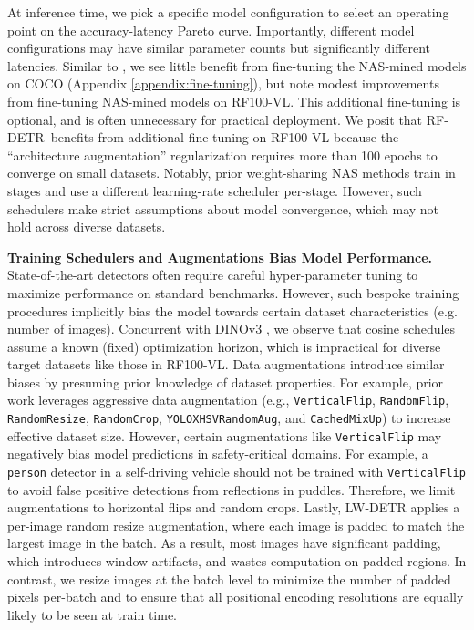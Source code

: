 \documentclass{article} %
\newcommand\isaac[1]{\textcolor{purered}{[Isaac: #1]}}
\newcommand\peter[1]{\textcolor{blue}{[Peter: #1]}}
\newcommand{\method}{RF-DETR}
\begin{document}
At inference time, we pick a specific model configuration to select an operating point on the accuracy-latency Pareto curve. Importantly, different model configurations may have similar parameter counts but significantly different latencies. Similar to \cite{cai2019ofa}, we see little benefit from fine-tuning the NAS-mined models on COCO (Appendix \ref{appendix:fine-tuning}), but note modest improvements from fine-tuning NAS-mined models on RF100-VL. This additional fine-tuning is optional, and is often unnecessary for practical deployment. We posit that \method \  benefits from additional fine-tuning on RF100-VL because the ``architecture augmentation'' regularization requires more than 100 epochs to converge on small datasets. Notably, prior weight-sharing NAS methods \citep{cai2019ofa} train in stages and use a different learning-rate scheduler per-stage. However, such schedulers make strict assumptions about model convergence, which may not hold across diverse datasets. %

\textbf{Training Schedulers and Augmentations Bias Model Performance.}
State-of-the-art detectors often require careful hyper-parameter tuning to maximize performance on standard benchmarks. However, such bespoke training procedures implicitly bias the model towards certain dataset characteristics (e.g. number of images). Concurrent with DINOv3 \citep{simeoni2025dinov3}, we observe that cosine schedules assume a known (fixed) optimization horizon, which is impractical for diverse target datasets like those in RF100-VL. %
Data augmentations introduce similar biases by presuming prior knowledge of dataset properties. For example, prior work leverages aggressive data augmentation (e.g., {\tt VerticalFlip}, {\tt RandomFlip}, {\tt RandomResize}, {\tt RandomCrop}, {\tt YOLOXHSVRandomAug}, and {\tt CachedMixUp}) to increase effective dataset size. However, certain augmentations like {\tt VerticalFlip} may negatively bias model predictions in safety-critical domains. For example, a {\tt person} detector in a self-driving vehicle should not be trained with {\tt VerticalFlip} to avoid false positive detections from reflections in puddles. Therefore, we limit augmentations to horizontal flips and random crops. %
Lastly, LW-DETR applies a per-image random resize augmentation, where each image is padded to match the largest image in the batch. As a result, most images have significant padding, which introduces window artifacts, and wastes computation on padded regions. In contrast, we resize images at the batch level to minimize the number of padded pixels per-batch and to ensure that all positional encoding resolutions are equally likely to be seen at train time.
\end{document}
